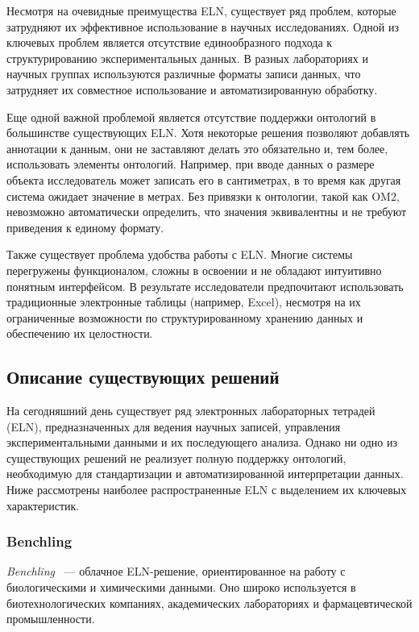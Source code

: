 Несмотря на очевидные преимущества ELN, существует ряд проблем, которые затрудняют их эффективное использование в научных исследованиях.
Одной из ключевых проблем является отсутствие единообразного подхода к структурированию экспериментальных данных.
В разных лабораториях и научных группах используются различные форматы записи данных, что затрудняет их совместное использование и автоматизированную обработку.

Еще одной важной проблемой является отсутствие поддержки онтологий в большинстве существующих ELN. Хотя некоторые решения позволяют добавлять аннотации к данным, они не заставляют делать это обязательно и, тем более, использовать элементы онтологий.
Например, при вводе данных о размере объекта исследователь может записать его в сантиметрах, в то время как другая система ожидает значение в метрах.
Без привязки к онтологии, такой как OM2, невозможно автоматически определить, что значения эквивалентны и не требуют приведения к единому формату.

Также существует проблема удобства работы с ELN. Многие системы перегружены функционалом, сложны в освоении и не обладают интуитивно понятным интерфейсом.
В результате исследователи предпочитают использовать традиционные электронные таблицы (например, Excel), несмотря на их ограниченные возможности по структурированному хранению данных и обеспечению их целостности.

\subsection{Описание существующих решений}

На сегодняшний день существует ряд электронных лабораторных тетрадей (ELN), предназначенных для ведения научных записей, управления экспериментальными данными и их последующего анализа.
Однако ни одно из существующих решений не реализует полную поддержку онтологий, необходимую для стандартизации и автоматизированной интерпретации данных.
Ниже рассмотрены наиболее распространенные ELN с выделением их ключевых характеристик.

\subsubsection{Benchling}
\textit{Benchling}~\cite{ELN:Benchling} — облачное ELN-решение, ориентированное на работу с биологическими и химическими данными.
Оно широко используется в биотехнологических компаниях, академических лабораториях и фармацевтической промышленности.

